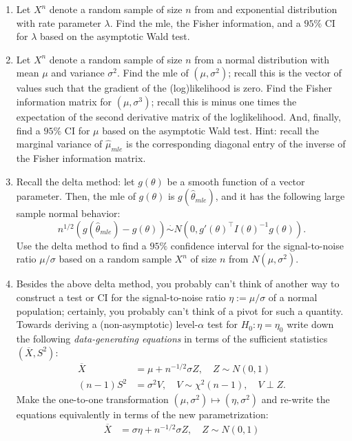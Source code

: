 \documentclass[
]{book}
\theoremstyle{definition}
\theoremstyle{definition}
\theoremstyle{definition}
\theoremstyle{definition}
\theoremstyle{remark}
\begin{document}
\begin{enumerate}
\def\labelenumi{\arabic{enumi}.}
\setcounter{enumi}{2}
\item
  Let \(X^n\) denote a random sample of size \(n\) from and exponential distribution with rate parameter \(\lambda\). Find the mle, the Fisher information, and a \(95\%\) CI for \(\lambda\) based on the asymptotic Wald test.
\item
  Let \(X^n\) denote a random sample of size \(n\) from a normal distribution with mean \(\mu\) and variance \(\sigma^2\). Find the mle of \((\mu, \sigma^2)\); recall this is the vector of values such that the gradient of the (log)likelihood is zero. Find the Fisher information matrix for \((\mu, \sigma^3)\); recall this is minus one times the expectation of the second derivative matrix of the loglikelihood. And, finally, find a \(95\%\) CI for \(\mu\) based on the asymptotic Wald test. Hint: recall the marginal variance of \(\hat\mu_{mle}\) is the corresponding diagonal entry of the inverse of the Fisher information matrix.
\item
  Recall the delta method: let \(g(\theta)\) be a smooth function of a vector parameter. Then, the mle of \(g(\theta)\) is \(g(\hat\theta_{mle})\), and it has the following large sample normal behavior:
  \[n^{1/2}(g(\hat\theta_{mle})-g(\theta)) \stackrel{\cdot}{\sim} N(0, g'(\theta)^\top I(\theta)^{-1}g(\theta)).\]
  Use the delta method to find a \(95\%\) confidence interval for the signal-to-noise ratio \(\mu/\sigma\) based on a random sample \(X^n\) of size \(n\) from \(N(\mu, \sigma^2)\).
\item
  Besides the above delta method, you probably can't think of another way to construct a test or CI for the signal-to-noise ratio \(\eta:=\mu/\sigma\) of a normal population; certainly, you probably can't think of a pivot for such a quantity. Towards deriving a (non-asymptotic) level-\(\alpha\) test for \(H_0:\eta = \eta_0\) write down the following \emph{data-generating equations} in terms of the sufficient statistics \((\overline X, S^2)\):
  \begin{align*} 
  \overline X &= \mu + n^{-1/2}\sigma Z, \quad Z\sim N(0,1)\\
  (n-1)S^2 &= \sigma^2 V, \quad V\sim \chi^2(n-1), \quad V\perp Z.
  \end{align*}
  Make the one-to-one transformation \((\mu, \sigma^2)\mapsto(\eta, \sigma^2)\) and re-write the equations equivalently in terms of the new parametrization:
  \begin{align*} 
  \overline X &= \sigma \eta + n^{-1/2}\sigma Z, \quad Z\sim N(0,1)\\

\end{align*}
\end{enumerate}
\end{document}
